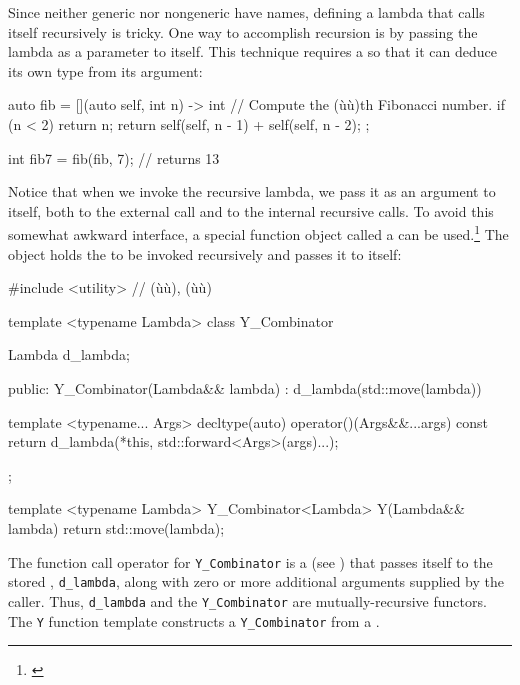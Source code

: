 {Since neither generic nor nongeneric  have
names, defining a lambda that calls itself recursively is tricky. One
way to accomplish recursion is by passing the lambda as a parameter to
itself. This technique requires a  so that it can
deduce its own type from its argument:

\begin{emcppslisting}[emcppsstandards={c++14}]
auto fib = [](auto self, int n) -> int  // Compute the (ù{}ù)th Fibonacci number.
{
    if (n < 2) { return n; }
    return self(self, n - 1) + self(self, n - 2);
};

int fib7 = fib(fib, 7);  // returns 13
\end{emcppslisting}
    

\noindent Notice that when we invoke the recursive lambda, we pass it as an
argument to itself, both to the external call and to the internal
recursive calls. To avoid this somewhat awkward interface, a special
function object called a  can be
used.{\cprotect\footnote{\cite{hindley86}}} The 
object holds the  to be invoked recursively and
passes it to itself:

\begin{emcppslisting}[emcppsbatch=e6,emcppsstandards={c++14}]
#include <utility>  // (ù{}ù), (ù{}ù)

template <typename Lambda>
class Y_Combinator {
    Lambda d_lambda;

public:
    Y_Combinator(Lambda&& lambda) : d_lambda(std::move(lambda)) { }

    template <typename... Args>
    decltype(auto) operator()(Args&&...args) const
    {
        return d_lambda(*this, std::forward<Args>(args)...);
    }
};

template <typename Lambda>
Y_Combinator<Lambda> Y(Lambda&& lambda) { return std::move(lambda); }
\end{emcppslisting}
    

\noindent The function call operator for \lstinline!Y_Combinator! is a
 (see
) that passes itself to the stored
, \lstinline!d_lambda!, along with zero or more
additional arguments supplied by the caller. Thus, \lstinline!d_lambda!
and the \lstinline!Y_Combinator! are mutually-recursive functors. The
\lstinline!Y! function template constructs a \lstinline!Y_Combinator! from a
.

}
